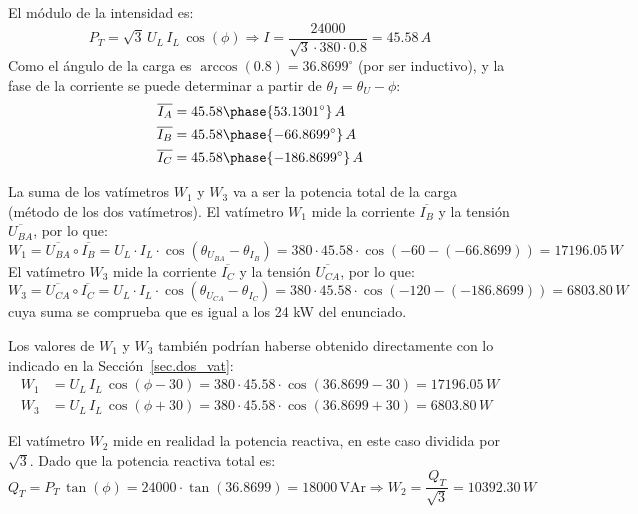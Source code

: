 \documentclass[11pt]{book} %
\begin{document}
\begin{example}
El módulo de la intensidad es:
\begin{equation*}
    P_T=\sqrt{3}\,U_L\,I_L\,\cos(\phi)\Rightarrow I=\dfrac{24000}{\sqrt{3}\cdot 380\cdot 0.8}=45.58\,A
\end{equation*}
Como el ángulo de la carga es $\arccos{(0.8)}=36.8699^\circ$ (por ser inductivo), y la fase de la corriente se puede determinar a partir de $\theta_I=\theta_U-\phi$:
\begin{align*}
    \overline{I_A}&=45.58\phase{53.1301^\circ}\,A\\
    \overline{I_B}&=45.58\phase{-66.8699^\circ}\,A\\
    \overline{I_C}&=45.58\phase{-186.8699^\circ}\,A
\end{align*}

La suma de los vatímetros $W_1$ y $W_3$ va a ser la potencia total de la carga (método de los dos vatímetros). El vatímetro $W_1$ mide la corriente $\overline{I_B}$ y la tensión $\overline{U_{BA}}$, por lo que: \begin{equation*}
    W_1=\overline{U_{BA}}\circ \overline{I_B}=U_{L}\cdot I_L\cdot \cos{(\theta_{U_{BA}}-\theta_{I_B})}= 380\cdot 45.58\cdot \cos(-60-(-66.8699))=17196.05\,W
\end{equation*}
El vatímetro $W_3$ mide la corriente $\overline{I_C}$ y la tensión $\overline{U_{CA}}$, por lo que: \begin{equation*}
    W_3=\overline{U_{CA}}\circ \overline{I_C}=U_{L}\cdot I_L\cdot \cos{(\theta_{U_{CA}}-\theta_{I_C})}= 380\cdot 45.58\cdot \cos(-120-(-186.8699))=6803.80\,W
\end{equation*}
cuya suma se comprueba que es igual a los 24 kW del enunciado.
\begin{remark}
    Los valores de $W_1$ y $W_3$ también podrían haberse obtenido directamente con lo indicado en la Sección~\ref{sec.dos_vat}:
    \begin{align*}
        W_1&=U_L\,I_L\,\cos(\phi-30)=380\cdot 45.58\cdot \cos(36.8699-30)=17196.05\,W\\
        W_3&=U_L\,I_L\,\cos(\phi+30)=380\cdot 45.58\cdot \cos(36.8699+30)=6803.80\,W
    \end{align*}
\end{remark}

El vatímetro $W_2$ mide en realidad la potencia reactiva, en este caso dividida por $\sqrt{3}$. Dado que la potencia reactiva total es:
\begin{equation*}
    Q_T=P_T\,\tan(\phi)=24000\cdot\tan(36.8699)=18000 \,\text{VAr}\Rightarrow W_2=\dfrac{Q_T}{\sqrt{3}}=10392.30\,W
\end{equation*}


\end{example}
\end{document}
